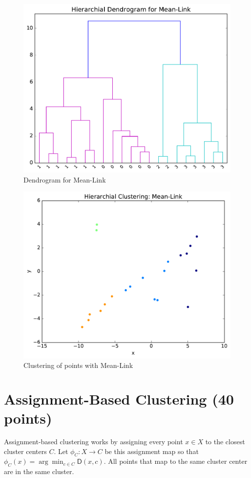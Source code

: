 \documentclass[11pt]{article}
\newcommand{\D}{\textsf{D}}
\begin{document}
\begin{figure}[H]
\centering
\includegraphics[width=.75\textwidth]{Mean-Link_dendro.pdf}
\caption{Dendrogram for Mean-Link}
\end{figure}

\begin{figure}[H]
\centering
\includegraphics[width=.75\textwidth]{Mean-Link.pdf}
\caption{Clustering of points with Mean-Link}
\end{figure}



\section{Assignment-Based Clustering (40 points)}

Assignment-based clustering works by assigning every point $x \in X$ to the closest cluster centers $C$.  Let $\phi_C : X \to C$ be this assignment map so that 
$\phi_C(x) = \arg \min_{c \in C} \D(x,c)$.  All points that map to the same cluster center are in the same cluster.  
\end{document}
